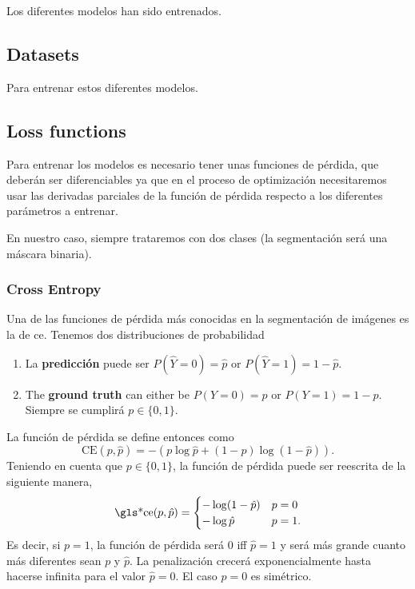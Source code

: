 Los diferentes modelos han sido entrenados.

\subsection{Datasets}

Para entrenar estos diferentes modelos.

\subsection{Loss functions}

Para entrenar los modelos es necesario tener unas funciones de pérdida, que
deberán ser diferenciables ya que en el proceso de optimización necesitaremos
usar las derivadas parciales de la función de pérdida respecto a los diferentes
parámetros a entrenar.

En nuestro caso, siempre trataremos con dos clases (la segmentación será una
máscara binaria).

\subsubsection{Cross Entropy}
Una de las funciones de pérdida más conocidas en la segmentación de imágenes es
la de \gls{ce}. Tenemos dos distribuciones de probabilidad

\begin{enumerate}
  \item La \textbf{predicción} puede ser \(P(\hat{Y} = 0) = \hat{p}\) or
  \(P(\hat{Y} = 1) = 1 - \hat{p}\).
  \item The \textbf{ground truth} can either be \(P(Y = 0) = p\) or
  \(P(Y = 1) = 1 - p\). Siempre se cumplirá \(p \in \{0, 1\}\).
\end{enumerate}

La función de pérdida se define entonces como
\begin{equation}
  \text{CE}(p, \hat{p}) = -(p\log\hat{p} + (1 - p)\log(1 - \hat{p})).
\end{equation}
Teniendo en cuenta que \(p \in \{0, 1\}\), la función de pérdida puede ser
reescrita de la siguiente manera,
\begin{equation}
  \text{\gls*{ce}}(p, \hat{p}) =
  \begin{cases}
    -\log(1 - \hat{p}) & p = 0 \\
    -\log\hat{p} & p = 1.
  \end{cases}
\end{equation}
Es decir, si \(p = 1\), la función de pérdida será \(0\) \gls{iff} \(\hat{p} =
1\) y será más grande cuanto más diferentes sean \(p\) y \(\hat{p}\). La
penalización crecerá exponencialmente hasta hacerse infinita para el valor
\(\hat{p} = 0\). El caso \(p = 0\) es simétrico.

